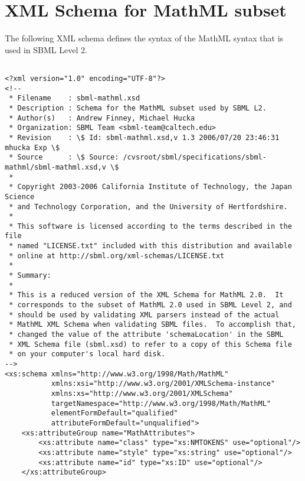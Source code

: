 
\section{XML Schema for MathML subset}
\label{apdx:mathml-subset-schema}

The following XML schema defines the syntax of the MathML syntax
that is used in SBML Level 2.

\begin{footnotesize}
\tightspacing
\begin{verbatim}

<?xml version="1.0" encoding="UTF-8"?>
<!--
 * Filename    : sbml-mathml.xsd
 * Description : Schema for the MathML subset used by SBML L2.
 * Author(s)   : Andrew Finney, Michael Hucka
 * Organization: SBML Team <sbml-team@caltech.edu>
 * Revision    : \$ Id: sbml-mathml.xsd,v 1.3 2006/07/20 23:46:31 mhucka Exp \$
 * Source      : \$ Source: /cvsroot/sbml/specifications/sbml-mathml/sbml-mathml.xsd,v \$
 *
 * Copyright 2003-2006 California Institute of Technology, the Japan Science
 * and Technology Corporation, and the University of Hertfordshire.
 *
 * This software is licensed according to the terms described in the file
 * named "LICENSE.txt" included with this distribution and available
 * online at http://sbml.org/xml-schemas/LICENSE.txt
 *
 * Summary:
 * 
 * This is a reduced version of the XML Schema for MathML 2.0.  It 
 * corresponds to the subset of MathML 2.0 used in SBML Level 2, and
 * should be used by validating XML parsers instead of the actual
 * MathML XML Schema when validating SBML files.  To accomplish that,
 * changed the value of the attribute 'schemaLocation' in the SBML
 * XML Schema file (sbml.xsd) to refer to a copy of this Schema file
 * on your computer's local hard disk.
-->
<xs:schema xmlns="http://www.w3.org/1998/Math/MathML" 
           xmlns:xsi="http://www.w3.org/2001/XMLSchema-instance" 
           xmlns:xs="http://www.w3.org/2001/XMLSchema" 
           targetNamespace="http://www.w3.org/1998/Math/MathML" 
           elementFormDefault="qualified" 
           attributeFormDefault="unqualified">
    <xs:attributeGroup name="MathAttributes">
        <xs:attribute name="class" type="xs:NMTOKENS" use="optional"/>
        <xs:attribute name="style" type="xs:string" use="optional"/>
        <xs:attribute name="id" type="xs:ID" use="optional"/>
    </xs:attributeGroup>

\end{verbatim}
\end{footnotesize}

